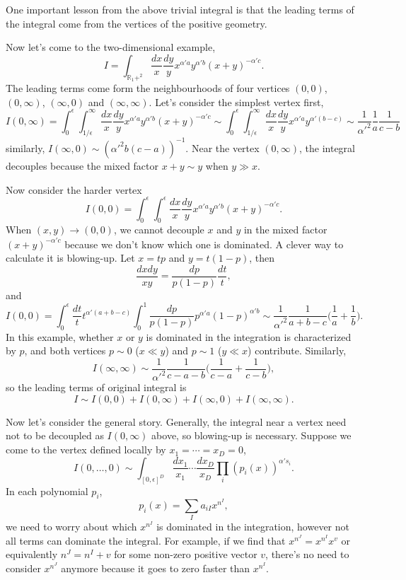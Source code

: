 \documentclass[12pt]{article}
\theoremstyle{definition}
\theoremstyle{plain}
\begin{document}
One important lesson from the above trivial integral is that the leading terms of the integral come from the vertices of the positive geometry. 

Now let's come to the two-dimensional example,
\[
	I=\int_{\mathbb R_1+^2} \frac{dx}{x}\frac{dy}{y}x^{\alpha' a}y^{\alpha' b}(x+y)^{-\alpha' c}.
\]
The leading terms come form the neighbourhoods of four vertices $(0,0)$, $(0,\infty)$, $(\infty,0)$ and $(\infty,\infty)$. Let's consider the simplest vertex first, 
\[
	I(0,\infty)=\int_{0}^\epsilon\int_{1/\epsilon}^\infty \frac{dx}{x}\frac{dy}{y}x^{\alpha' a}y^{\alpha' b}(x+y)^{-\alpha' c}\sim \int_{0}^\epsilon\int_{1/\epsilon}^\infty \frac{dx}{x}\frac{dy}{y}x^{\alpha' a}y^{\alpha' (b-c)}\sim 
	\frac{1}{{\alpha'}^2}\frac{1}{a} \frac{1}{c-b}
\]
similarly, $I(\infty,0)\sim ({\alpha'}^2 b (c-a))^{-1}$. Near the vertex $(0,\infty)$, the integral decouples because the mixed factor $x+y \sim y$ when $y \gg x$.  

Now consider the harder vertex
\[
	I(0,0)=\int_{0}^\epsilon\int_0^{\epsilon} \frac{dx}{x}\frac{dy}{y}x^{\alpha' a}y^{\alpha' b}(x+y)^{-\alpha' c}.
\]
When $(x,y)\to (0,0)$, we cannot decouple $x$ and $y$ in the mixed factor $(x+y)^{-\alpha' c}$ because we don't know which one is dominated. A clever way to calculate it is blowing-up. Let $x = tp$ and $y=t(1-p)$, then
\begin{equation}\label{canonicalformunderblowup}
	\frac{dxdy}{xy} = \frac{dp}{p(1-p)}\frac{dt}{t},
\end{equation}
and
\begin{equation*}
	I(0,0)=\int_{0}^\epsilon\frac{dt}{t} t^{\alpha'(a+b-c)}\int_0^{1}\frac{dp}{p(1-p)}p^{\alpha' a}(1-p)^{\alpha' b}%
	\sim \frac{1}{{\alpha'}^2}\frac{1}{a+b-c}\biggl(\frac 1a+\frac 1b\biggr).
\end{equation*}
In this example, whether $x$ or $y$ is dominated in the integration is characterized by $p$, and both vertices $p\sim 0$ ($x\ll y$) and $p\sim 1$ ($y\ll x$) contribute. Similarly, 
\[
	I(\infty,\infty)\sim \frac{1}{{\alpha'}^2}\frac{1}{c-a-b}\biggl(\frac 1{c-a}+\frac 1{c-b}\biggr),
\]
so the leading terms of original integral is 
\[
	I\sim I(0,0)+I(0,\infty)+I(\infty,0)+I(\infty,\infty).
\]

Now let's consider the general story. Generally, the integral near a vertex need not to be decoupled as $I(0,\infty)$ above, so blowing-up is necessary. Suppose we come to the vertex defined locally by $x_1=\cdots=x_D=0$, 
\[
	I(0,\dots,0)\sim \int_{[0,\epsilon]^D} \frac{d x_1}{x_1}\cdots \frac{d x_D}{x_D} \prod_i(p_i(x))^{\alpha' s_i}.
\]
In each polynomial $p_i$, 
\[
	p_i(x)=\sum_{I} a_{iI} x^{n^I},
\]
we need to worry about which $x^{n^I}$ is dominated in the integration, however not all terms can  dominate the integral. For example, if we find that $x^{n^J}=x^{n^I}x^{v}$ or equivalently $n^J=n^I+v$ for some non-zero positive vector $v$, there's no need to consider $x^{n^J}$ anymore because it goes to zero faster than $x^{n^I}$. 
\end{document}
